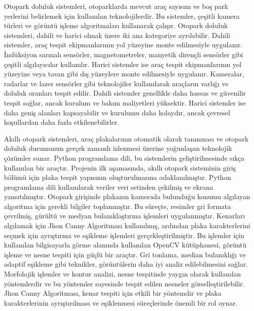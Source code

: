 \documentclass[]{article}
\begin{document}
	Otopark doluluk sistemleri, otoparklarda mevcut araç sayısını ve boş park yerlerini belirlemek için kullanılan teknolojilerdir. Bu sistemler, çeşitli kamera türleri ve görüntü işleme algoritmaları kullanarak çalışır. Otopark doluluk sistemleri, dahili ve harici olmak üzere iki ana kategoriye ayrılabilir. Dahili sistemler, araç tespit ekipmanlarının yol yüzeyine monte edilmesiyle uygulanır. İndüksiyon sarmalı sensörler, magnetometreler, manyetik dirençli sensörler gibi çeşitli algılayıcılar kullanılır. Harici sistemler ise araç tespit ekipmanlarının yol yüzeyine veya tavan gibi dış yüzeylere monte edilmesiyle uygulanır. Kameralar, radarlar ve lazer sensörler gibi teknolojiler kullanılarak araçların varlığı ve doluluk oranları tespit edilir. Dahili sistemler genellikle daha hassas ve güvenilir tespit sağlar, ancak kurulum ve bakım maliyetleri yüksektir. Harici sistemler ise daha geniş alanları kapsayabilir ve kurulumu daha kolaydır, ancak çevresel koşullardan daha fazla etkilenebilirler\cite{article_1098978}.
	
	Akıllı otopark sistemleri, araç plakalarının otomatik olarak tanınması ve otopark doluluk durumunun gerçek zamanlı izlenmesi üzerine yoğunlaşan teknolojik çözümler sunar. Python programlama dili, bu sistemlerin geliştirilmesinde sıkça kullanılan bir araçtır. Projenin ilk aşamasında, akıllı otopark sisteminin giriş bölümü için plaka tespit yapısının oluşturulmasına odaklanılmıştır. Python programlama dili kullanılarak veriler veri setinden çekilmiş ve ekrana yansıtılmıştır. Otopark girişinde plakanın kamerada bulunduğu konumu algılayan algoritma için gerekli bilgiler toplanmıştır. Bu süreçte, resimler gri formata çevrilmiş, gürültü ve medyan bulanıklaştırma işlemleri uygulanmıştır. Kenarları algılamak için Jhon Canny Algoritması kullanılmış, ardından plaka karakterlerini seçmek için ayrıştırma ve eşikleme işlemleri gerçekleştirilmiştir. Bu işlemler için kullanılan bilgisayarla görme alanında kullanılan OpenCV kütüphanesi, görüntü işleme ve nesne tespiti için güçlü bir araçtır. Gri tonlama, median bulanıklığı ve adaptif eşikleme gibi teknikler, görüntülerin daha iyi analiz edilebilmesini sağlar. Morfolojik işlemler ve kontur analizi, nesne tespitinde yaygın olarak kullanılan yöntemlerdir ve bu yöntemler sayesinde tespit edilen nesneler görselleştirilebilir. Jhon Canny Algoritması, kenar tespiti için etkili bir yöntemdir ve plaka karakterlerinin ayrıştırılması ve 	eşiklenmesi süreçlerinde önemli bir rol oynar\cite{github}.
	
\end{document}

